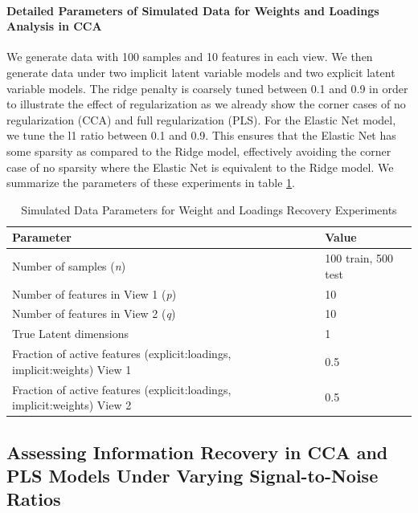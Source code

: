 \paragraph{Detailed Parameters of Simulated Data for Weights and Loadings Analysis in CCA} We generate data with 100 samples and 10 features in each view.
We then generate data under two implicit latent variable models and two explicit latent variable models.
The ridge penalty is coarsely tuned between 0.1 and 0.9 in order to illustrate the effect of regularization as we already show the corner cases of no regularization (CCA) and full regularization (PLS).
For the Elastic Net model, we tune the l1 ratio between 0.1 and 0.9. This ensures that the Elastic Net has some sparsity as compared to the Ridge model, effectively avoiding the corner case of no sparsity where the Elastic Net is equivalent to the Ridge model.
We summarize the parameters of these experiments in table \ref{tab:simulated-data-parameters}.

\begin{table}
    \centering
    \caption{Simulated Data Parameters for Weight and Loadings Recovery Experiments}
    \begin{tabular}{| l | l |}
        \hline
        \textbf{Parameter}                        & \textbf{Value}                               \\
        \hline
        Number of samples (\textit{n})            & 100 train, 500 test                            \\
        Number of features in View 1 (\textit{p}) & 10 \\
        Number of features in View 2 (\textit{q}) & 10 \\
        True Latent dimensions                    & 1                                            \\
        Fraction of active features (explicit:loadings, implicit:weights) View 1            & 0.5                                          \\
        Fraction of active features (explicit:loadings, implicit:weights) View 2            & 0.5                                          \\
        \hline
    \end{tabular}\label{tab:simulated-data-parameters}
\end{table}

\subsection{Assessing Information Recovery in CCA and PLS Models Under Varying Signal-to-Noise Ratios}

